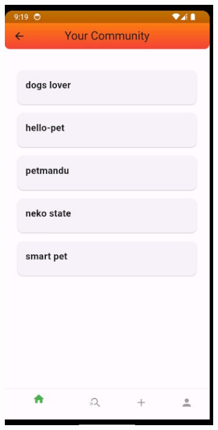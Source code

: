 \vspace{1cm}
\begin{figure}[ht]
  \centering
    \begin{subfigure}{0.3\textwidth}
    \includegraphics[width=\linewidth]{img/community.jpg}

\end{subfigure}
\end{figure}
